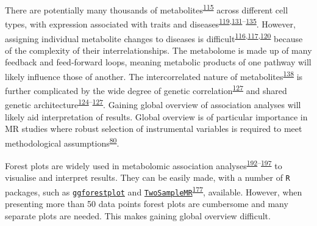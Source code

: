 \documentclass[11pt,twoside]{bristolthesis}
\begin{document}
There are potentially many thousands of metabolites\textsuperscript{\protect\hyperlink{ref-Griffin2006}{115}} across different cell types, with expression associated with traits and diseases\textsuperscript{\protect\hyperlink{ref-Johnson2016}{119},\protect\hyperlink{ref-Guasch-Ferre2016}{131}--\protect\hyperlink{ref-Wishart2018}{135}}. However, assigning individual metabolite changes to diseases is difficult\textsuperscript{\protect\hyperlink{ref-Su2014}{116},\protect\hyperlink{ref-Chu2019}{117},\protect\hyperlink{ref-Fearnley2016}{120}} because of the complexity of their interrelationships. The metabolome is made up of many feedback and feed-forward loops, meaning metabolic products of one pathway will likely influence those of another. The intercorrelated nature of metabolites\textsuperscript{\protect\hyperlink{ref-Rosato2018}{138}} is further complicated by the wide degree of genetic correlation\textsuperscript{\protect\hyperlink{ref-Gallois2019}{127}} and shared genetic architecture\textsuperscript{\protect\hyperlink{ref-Shin2014}{124}--\protect\hyperlink{ref-Gallois2019}{127}}. Gaining global overview of association analyses will likely aid interpretation of results. Global overview is of particular importance in MR studies where robust selection of instrumental variables is required to meet methodological assumptions\textsuperscript{\protect\hyperlink{ref-DaveySmith2003}{80}}.

Forest plots are widely used in metabolomic association analyses\textsuperscript{\protect\hyperlink{ref-May-Wilson2017}{192}--\protect\hyperlink{ref-Borges2017}{197}} to visualise and interpret results. They can be easily made, with a number of \texttt{R} packages, such as \href{https://github.com/nightingalehealth/ggforestplot}{\texttt{ggforestplot}} and \href{https://mrcieu.github.io/TwoSampleMR/\#to-many-forest-plot}{\texttt{TwoSampleMR}}\textsuperscript{\protect\hyperlink{ref-Hemani2018}{177}}, available. However, when presenting more than 50 data points forest plots are cumbersome and many separate plots are needed. This makes gaining global overview difficult.
\end{document}
